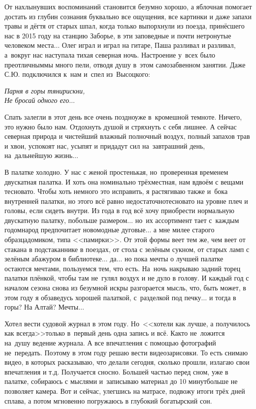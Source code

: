 От нахлынувших воспоминаний становится безумно хорошо, а яблочная помогает достать из глубин сознания буквально все ощущения, все картинки и даже запахи травы и дёгтя от старых шпал, когда только выпорхнули из поезда, принёсшего нас в 2015 году на станцию Заборье, в эти заповедные и почти нетронутые человеком места$\ldots$ Олег играл и играл на гитаре, Паша разливал и разливал, а~вокруг нас наступала тихая северная ночь. Настроение у~всех было преотличным\mdash мы много пели, отводя душу в~этом самозабвенном занятии. Даже С.Ю. подключился к~нам и~спел из~Высоцкого:%

\vspace{0.1cm}
\noindent\textit{%
	\hspace*{2.9cm}Парня в горы тяни\mdash рискни,\\
	\hspace*{2.9cm}Не бросай одного его$\ldots$ 
}
\vspace{0.1cm}

Спать залегли в этот день все очень поздно\mdash уже в~кромешной темноте. Ничего, это нужно было нам. Отдохнуть душой и стряхнуть с себя лишнее. А сейчас северная природа и чистейший влажный полночный воздух, полный запахов трав и хвои, успокоят нас, усыпят и придадут сил на~завтрашний день, на~дальнейшую жизнь$\ldots$ 

В палатке холодно. У нас с женой простенькая, но~проверенная временем двускатная палатка. И хоть она номинально трёхместная, нам вдвоём с вещами тесновато. Чтобы хоть немного это исправить, я растягиваю также и~бока внутренней палатки, но этого всё равно недостаточно\mdash тесновато на уровне плеч и головы, если сидеть внутри. Из года в год всё хочу приобрести нормальную двускатную палатку, побольше размером$\ldots$ но~их ассортимент тает с~каждым годом\mdash народ предпочитает новомодные дуговые$\ldots$ а мне милее старого образца\mdash домиком, типа <<памирки>>. От этой формы веет тем же, чем веет от стакана в подстаканнике в поездах, от стола с зелёным сукном, от старых ламп с зелёным абажуром в библиотеке$\ldots$ да$\ldots$ но пока мечты о лучшей палатке остаются мечтами, пользуемся тем, что есть. На~ночь накрываю задний торец палатки плёнкой, чтобы там не~гулял воздух и не дуло в голову. И каждый год с началом сезона снова из безумной искры разгорается мысль, что, быть может, в этом году я обзаведусь хорошей палаткой, с~разделкой под печку$\ldots$ и тогда в горы? На Алтай? Мечты$\ldots$

Хотел вести судовой журнал в этом году. Но~<<хотели как лучше, а получилось как всегда>>\mdash только в~первый день одна запись и всё. Как\sdash то не~ложится на~душу ведение журнала. А все впечатления с помощью фотографий не~передать. Поэтому в этом году решаю вести видеозарисовки. То есть снимаю видео, в которых расказываю, что делали сегодня, сколько прошли, излагаю свои впечатления и т.д. Получается сносно. Большей частью перед сном, уже в палатке, собираюсь с мыслями и~записываю материал до 10 минут\mdash больше не позволяет камера. Вот и сейчас, улегшись на матрасе, подвожу итоги трёх дней сплава, а потом мгновенно погружаюсь в глубокий богатырский сон.

\begin{center}
\end{center}

